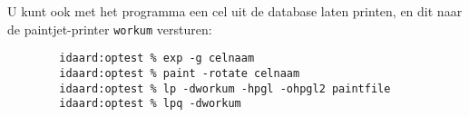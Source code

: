 U kunt ook met het programma  een cel uit de database
laten printen,
en dit naar de paintjet-printer {\tt workum} versturen:
\begin{verbatim}
        idaard:optest % exp -g celnaam
        idaard:optest % paint -rotate celnaam
        idaard:optest % lp -dworkum -hpgl -ohpgl2 paintfile
        idaard:optest % lpq -dworkum
\end{verbatim}
\cleardoublepage
